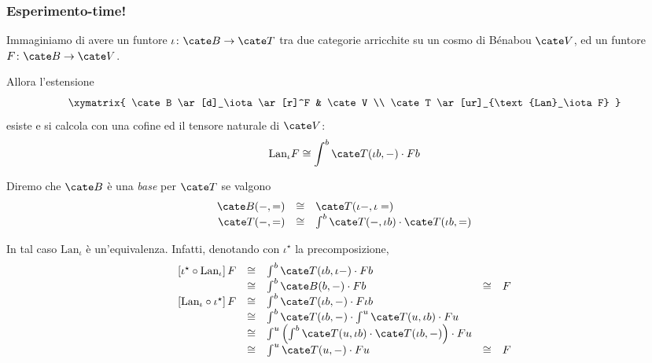 




\subsubsection*{Esperimento-time!}

Immaginiamo di avere un funtore $\iota\colon\cate B\to\cate T$ tra due categorie arricchite su un cosmo di Bénabou $\cate V$, ed un funtore $F\colon\cate B\to\cate V$.

Allora l'estensione
\[\xymatrix{
\cate B \ar[d]_\iota \ar[r]^F & \cate V \\
\cate T \ar[ur]_{\text{Lan}_\iota F}
}\]
esiste e si calcola con una cofine ed il tensore naturale di $\cate V$:
\[ \text{Lan}_\iota F \cong \int^b \cate T(\iota b,-)\cdot Fb \]

Diremo che $\cate B$ è una {\it base} per $\cate T$ se valgono
\[\begin{array}{rcl}
\cate B(-,=) &\cong& \cate T (\iota-,\iota=) \\
\cate T(-,=) &\cong& \int^b \cate T(-,\iota b)\cdot\cate T(\iota b,=)
\end{array}\]

In tal caso $\text{Lan}_\iota$ è un'equivalenza.
Infatti, denotando con $\iota^\star$ la precomposizione,
\[\begin{array}{rclcl}
\left[\iota^\star\circ\text{Lan}_\iota\right]F
&\cong&
\int^b \cate T(\iota b,\iota-)\cdot Fb \\
&\cong&
\int^b \cate B(b,-)\cdot Fb
&\cong&
F \\
\left[\text{Lan}_\iota\circ\iota^\star\right]F
&\cong&
\int^b\cate T(\iota b,-)\cdot F\iota b \\
&\cong&
\int^b\cate T(\iota b,-)\cdot\int^u\cate T(u,\iota b)\cdot Fu \\
&\cong&
\int^u\left(\int^b\cate T(u,\iota b)\cdot\cate T(\iota b,-)\right)\cdot Fu \\
&\cong&
\int^u\cate T(u,-)\cdot Fu
&\cong&
F
\end{array}\]




